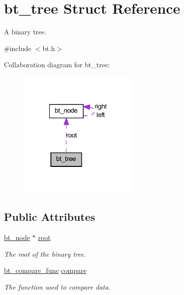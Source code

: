 \hypertarget{structbt__tree}{
\section{bt\_\-tree Struct Reference}
\label{structbt__tree}
}


A binary tree.  




{\ttfamily \#include $<$bt.h$>$}



Collaboration diagram for bt\_\-tree:\nopagebreak
\begin{figure}[H]
\begin{center}
\leavevmode
\includegraphics[width=167pt]{structbt__tree__coll__graph}
\end{center}
\end{figure}
\subsection*{Public Attributes}
\begin{DoxyCompactItemize}
\item 
\hyperlink{structbt__node}{bt\_\-node} $\ast$ \hyperlink{structbt__tree_ae428a77981f3b9f27f959b78ed468db7}{root}
\begin{DoxyCompactList}\small\item\em The root of the binary tree. \item\end{DoxyCompactList}\item 
\hyperlink{bt_8h_a8a7bf1216efb8b05f20a020acd705f75}{bt\_\-compare\_\-func} \hyperlink{structbt__tree_a7ac2a5e50551c1a10b1bf3884cd12af5}{compare}
\begin{DoxyCompactList}\small\item\em The function used to compare data. \item\end{DoxyCompactList}\end{DoxyCompactItemize}


